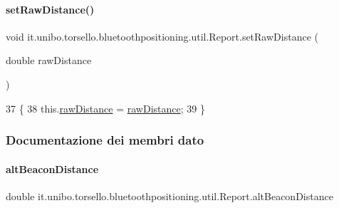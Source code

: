 \paragraph{\texorpdfstring{set\+Raw\+Distance()}{setRawDistance()}}
{\footnotesize\ttfamily void it.\+unibo.\+torsello.\+bluetoothpositioning.\+util.\+Report.\+set\+Raw\+Distance (\begin{DoxyParamCaption}\item[{double}]{raw\+Distance }\end{DoxyParamCaption})}


\begin{DoxyCode}
37                                                    \{
38         this.\hyperlink{classit_1_1unibo_1_1torsello_1_1bluetoothpositioning_1_1util_1_1Report_a93ee0f28ccf1d54becdedff2ad65955f_a93ee0f28ccf1d54becdedff2ad65955f}{rawDistance} = \hyperlink{classit_1_1unibo_1_1torsello_1_1bluetoothpositioning_1_1util_1_1Report_a93ee0f28ccf1d54becdedff2ad65955f_a93ee0f28ccf1d54becdedff2ad65955f}{rawDistance};
39     \}
\end{DoxyCode}


\subsubsection{Documentazione dei membri dato}
\hypertarget{classit_1_1unibo_1_1torsello_1_1bluetoothpositioning_1_1util_1_1Report_aad81754844fb8364075ab69052730a98_aad81754844fb8364075ab69052730a98}{}\label{classit_1_1unibo_1_1torsello_1_1bluetoothpositioning_1_1util_1_1Report_aad81754844fb8364075ab69052730a98_aad81754844fb8364075ab69052730a98} 
\paragraph{\texorpdfstring{alt\+Beacon\+Distance}{altBeaconDistance}}
{\footnotesize\ttfamily double it.\+unibo.\+torsello.\+bluetoothpositioning.\+util.\+Report.\+alt\+Beacon\+Distance\hspace{0.3cm}{\ttfamily [private]}}

\hypertarget{classit_1_1unibo_1_1torsello_1_1bluetoothpositioning_1_1util_1_1Report_a138fc5e4cf100d8af6d526d1f593609d_a138fc5e4cf100d8af6d526d1f593609d}{}\label{classit_1_1unibo_1_1torsello_1_1bluetoothpositioning_1_1util_1_1Report_a138fc5e4cf100d8af6d526d1f593609d_a138fc5e4cf100d8af6d526d1f593609d} 
